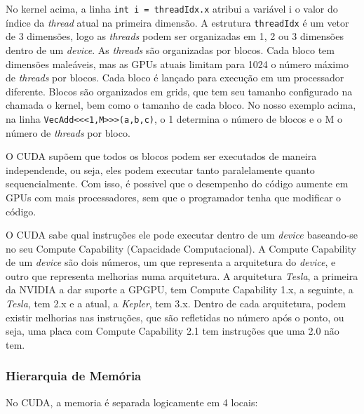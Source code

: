 No kernel acima, a linha \verb#int i = threadIdx.x# atribui a variável i o valor do índice da \textit{thread} atual na primeira dimensão. 
A estrutura \verb#threadIdx# é um vetor de 3 dimensões, logo as \textit{threads} podem ser organizadas em 1, 2 ou 3 dimensões dentro de um
\textit{device}. As \textit{threads} são organizadas por blocos. Cada bloco tem dimensões maleáveis, mas as GPUs atuais limitam para 1024 o 
número máximo de \textit{threads} por blocos. Cada bloco é lançado para execução em um processador diferente. Blocos são organizados em 
grids, que tem seu tamanho configurado na chamada o kernel, bem como o tamanho de cada bloco. No nosso exemplo acima, na linha
\verb#VecAdd<<<1,M>>>(a,b,c)#, o 1 determina o número de blocos e o M o número de \textit{threads} por bloco.

O CUDA supõem que todos os blocos podem ser executados de maneira independende, ou seja, eles podem executar tanto paralelamente
quanto sequencialmente. Com isso, é possivel que o desempenho do código aumente em GPUs com mais processadores, sem que o programador
tenha que modificar o código.

O CUDA sabe qual instruções ele pode executar dentro de um \textit{device} baseando-se no seu Compute Capability 
(Capacidade Computacional). A Compute Capability de um \textit{device} são dois números, um que representa a arquitetura do 
\textit{device}, e outro que representa melhorias numa arquitetura.
A arquitetura \textit{Tesla}, a primeira da NVIDIA a dar suporte a GPGPU, tem Compute Capability 1.x, a seguinte, a \textit{Tesla},
tem 2.x e a atual, a \textit{Kepler}, tem 3.x. Dentro de cada arquitetura, podem existir melhorias nas instruções, que são
refletidas no número após o ponto, ou seja, uma placa com Compute Capability 2.1 tem instruções que uma 2.0 não tem.

\subsubsection{Hierarquia de Memória}
No CUDA, a memoria é separada logicamente em 4 locais:

